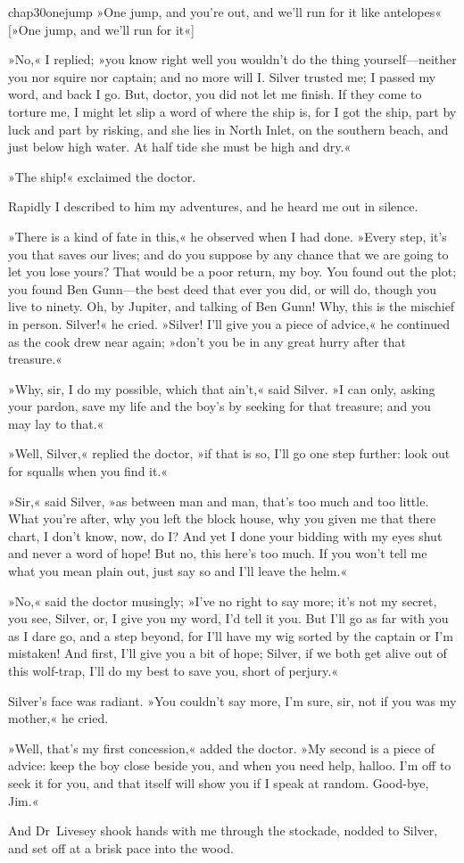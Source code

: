\begin{bwbigpic}
	[\picsize]
	{chap30onejump}
	{»One jump, and you're out, and we'll run for it like antelopes«}
	[»One jump, and we'll run for it«]
\end{bwbigpic}

»No,« I replied; »you know right well you wouldn't do the thing yourself—neither you nor squire nor captain; and no more will I. Silver trusted me; I passed my word, and back I go. But, doctor, you did not let me finish. If they come to torture me, I might let slip a word of where the ship is, for I got the ship, part by luck and part by risking, and she lies in North Inlet, on the southern beach, and just below high water. At half tide she must be high and dry.«

»The ship!« exclaimed the doctor.

Rapidly I described to him my adventures, and he heard me out in silence.

»There is a kind of fate in this,« he observed when I had done. »Every step, it's you that saves our lives; and do you suppose by any chance that we are going to let you lose yours? That would be a poor return, my boy. You found out the plot; you found Ben Gunn—the best deed that ever you did, or will do, though you live to ninety. Oh, by Jupiter, and talking of Ben Gunn! Why, this is the mischief in person. Silver!« he cried. »Silver! I'll give you a piece of advice,« he continued as the cook drew near again; »don't you be in any great hurry after that treasure.«

»Why, sir, I do my possible, which that ain't,« said Silver. »I can only, asking your pardon, save my life and the boy's by seeking for that treasure; and you may lay to that.«

»Well, Silver,« replied the doctor, »if that is so, I'll go one step further: look out for squalls when you find it.«

»Sir,« said Silver, »as between man and man, that's too much and too little. What you're after, why you left the block house, why you given me that there chart, I don't know, now, do I? And yet I done your bidding with my eyes shut and never a word of hope! But no, this here's too much. If you won't tell me what you mean plain out, just say so and I'll leave the helm.«

»No,« said the doctor musingly; »I've no right to say more; it's not my secret, you see, Silver, or, I give you my word, I'd tell it you. But I'll go as far with you as I dare go, and a step beyond, for I'll have my wig sorted by the captain or I'm mistaken! And first, I'll give you a bit of hope; Silver, if we both get alive out of this wolf-trap, I'll do my best to save you, short of perjury.«

Silver's face was radiant. »You couldn't say more, I'm sure, sir, not if you was my mother,« he cried.

»Well, that's my first concession,« added the doctor. »My second is a piece of advice: keep the boy close beside you, and when you need help, halloo. I'm off to seek it for you, and that itself will show you if I speak at random. Good-bye, Jim.«

And Dr~Livesey shook hands with me through the stockade, nodded to Silver, and set off at a brisk pace into the wood.